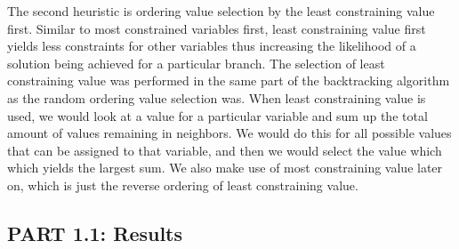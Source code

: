 \documentclass[11pt]{article}
\begin{document}
The second heuristic is ordering value selection by the least constraining value first. Similar to most constrained variables first, least constraining value first yields less constraints for other variables thus increasing the likelihood of a solution being achieved for a particular branch. The selection of least constraining value was performed in the same part of the backtracking algorithm as the random ordering value selection was. When least constraining value is used, we would look at a value for a particular variable and sum up the total amount of values remaining in neighbors. We would do this for all possible values that can be assigned to that variable, and then we would select the value which which yields the largest sum. We also make use of most constraining value later on, which is just the reverse ordering of least constraining value.

\pagebreak


\subsection*{PART 1.1: Results}
\end{document}
